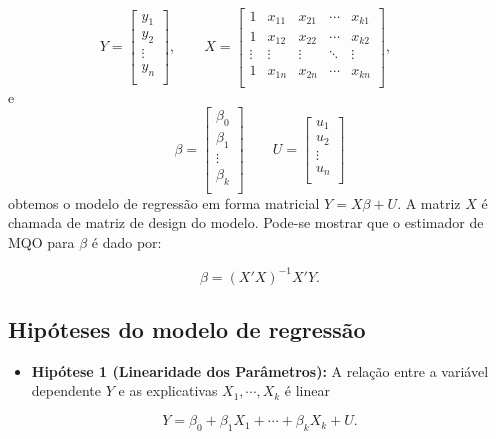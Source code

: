 \documentclass[
]{book}
\providecommand{\tightlist}{%
  \setlength{\itemsep}{0pt}\setlength{\parskip}{0pt}}
\theoremstyle{definition}
\theoremstyle{definition}
\theoremstyle{definition}
\theoremstyle{remark}
\begin{document}
\[Y=\left[ \begin{array}{c}
   y_{1} \\
   y_{2} \\
  \vdots \\
   y_{n} \\
         \end{array}
  \right], \qquad X=\left[
\begin{array}{ccccc}
  1 & x_{11} & x_{21} & \cdots & x_{k1} \\
  1 & x_{12} & x_{22} & \cdots & x_{k2} \\
  \vdots & \vdots & \vdots & \ddots & \vdots \\
  1 & x_{1n} & x_{2n} & \cdots & x_{kn} \\
\end{array}
\right], \qquad
\]
e
\[
{\beta}=\left[ \begin{array}{c}
   \beta_0 \\
   \beta_1 \\
  \vdots \\
   \beta_k \\
         \end{array}
  \right]
\qquad U=
\left[ \begin{array}{c}
   u_{1} \\
   u_{2} \\
  \vdots \\
   u_{n} \\
         \end{array}
  \right] \]
obtemos o modelo de regressão em forma matricial \(Y=X{ \beta}+U\). A matriz \(X\) é chamada de matriz de design do modelo. Pode-se mostrar que o estimador de MQO para \(\beta\) é dado por:

\[\hat{\beta}=(X'X)^{-1}X'Y.\]

\hypertarget{hipuxf3teses-do-modelo-de-regressuxe3o}{%
\subsection{Hipóteses do modelo de regressão}\label{hipuxf3teses-do-modelo-de-regressuxe3o}}

\begin{itemize}
\tightlist
\item
  \textbf{Hipótese 1 (Linearidade dos Parâmetros): } A relação entre a variável dependente \(Y\) e as explicativas \(X_1, \cdots, X_k\) é linear
\end{itemize}

\[Y=\beta_0+\beta_1X_1+\cdots+\beta_kX_{k}+U.\]
\end{document}
